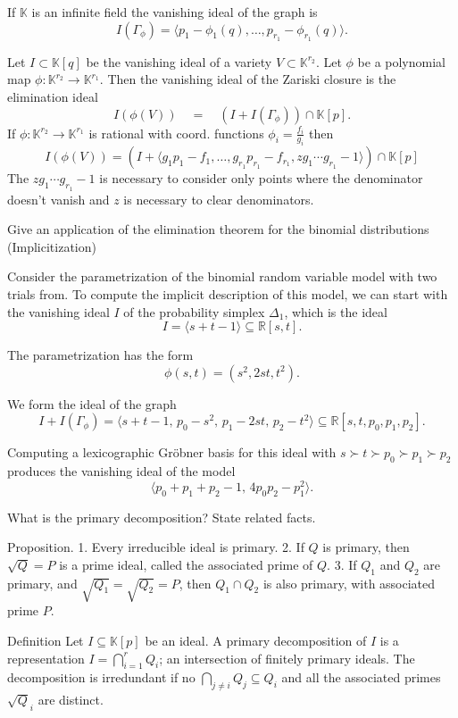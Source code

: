 If \(\mathbb{K}\) is an infinite field the vanishing ideal of the graph is
\[
I(\Gamma_\phi) = \langle p_1 - \phi_1(q), \ldots, p_{r_1} - \phi_{r_1}(q) \rangle.
\]

Let \(I \subset \mathbb{K}[q]\) be the vanishing ideal of a variety \(V \subset \mathbb{K}^{r_2}\). 
Let \(\phi\) be a polynomial map \(\phi : \mathbb{K}^{r_2} \to \mathbb{K}^{r_1}\). 
Then the vanishing ideal of the Zariski closure is the elimination ideal
\[
I(\phi(V))\quad =\quad (I + I(\Gamma_\phi)) \cap \mathbb{K}[p].
\]
If \( \phi : \mathbb{K}^{r_2} \to \mathbb{K}^{r_1} \) is rational with coord. functions \( \phi_i = \frac{f_i}{g_i} \) 
then
\[
    I(\phi(V)) = \left(I + \langle g_1 p_1 - f_1, \dots, g_{r_1}p_{r_1} - f_{r_1}, zg_1 \cdots g_{r_1} - 1 \rangle \right) \cap \mathbb{K}[p]
\]
The \( zg_1 \cdots g_{r_1} - 1 \) is necessary to consider only points where the denominator doesn't vanish and \( z \) is necessary
to clear denominators.


Give an application of the elimination theorem for the binomial distributions (Implicitization)

Consider the parametrization of the binomial random variable model with two trials from. 
To compute the implicit description of this model, we can start with the vanishing ideal \(I\) of the probability simplex \(\Delta_1\), 
which is the ideal
\[
I = \langle s + t - 1 \rangle \subseteq \mathbb{R}[s, t].
\]

The parametrization has the form
\[
\phi(s, t) = (s^2, 2st, t^2).
\]

We form the ideal of the graph
\[
I + I(\Gamma_\phi) = \langle s + t - 1,\, p_0 - s^2,\, p_1 - 2st,\, p_2 - t^2 \rangle \subseteq \mathbb{R}[s, t, p_0, p_1, p_2].
\]

Computing a lexicographic Gröbner basis for this ideal with \(s \succ t \succ p_0 \succ p_1 \succ p_2\) produces the vanishing ideal of the model
\[
\langle p_0 + p_1 + p_2 - 1,\, 4p_0p_2 - p_1^2 \rangle.
\]


What is the primary decomposition? State related facts.

Proposition.
1. Every irreducible ideal is primary.
2. If \( Q \) is primary, then \( \sqrt{Q} = P \) is a prime ideal, called the associated prime of \( Q \).
3. If \( Q_1 \) and \( Q_2 \) are primary, and \( \sqrt{Q_1} = \sqrt{Q_2} = P \), then \( Q_1 \cap Q_2 \) is also primary, 
   with associated prime \( P \).

Deﬁnition 
Let \( I \subseteq \mathbb{K}[p] \) be an ideal. A primary decomposition of \( I \)
is a representation \( I = \bigcap_{i=1}^r Q_i \); an intersection of finitely primary ideals. 
The decomposition is irredundant if no \( \bigcap_{j\neq i} Q_j \subseteq Q_i \) and
all the associated primes \( \sqrt{Q}_i \) are distinct.

